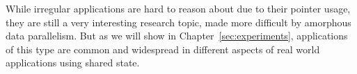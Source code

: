 While irregular applications are hard to reason about due to their pointer usage, they are still a very interesting research topic, made more difficult by amorphous data parallelism.
But as we will show in Chapter~\ref{sec:experiments}, applications of this type are common and widespread in different aspects of real world applications using shared state.





